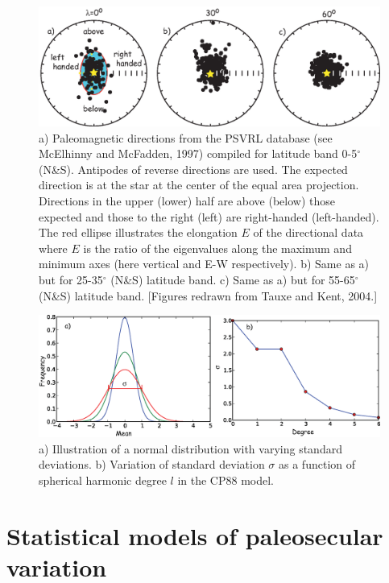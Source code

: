\begin{figure}[htb]
\centering  \includegraphics[width=14 cm]{EPSfiles/psvrl.eps}
\caption{a) Paleomagnetic directions from the PSVRL database (see  McElhinny and McFadden, 1997) compiled for latitude band 0-5$^{\circ}$ (N\&S).  Antipodes of reverse directions are used.  The expected direction is at the star at the center of the equal area projection.  Directions in the upper (lower) half are above (below) those expected and those to the right (left) are right-handed (left-handed).  The red ellipse illustrates the elongation $E$ of the directional data where $E$ is the ratio of the eigenvalues along the maximum and minimum axes (here vertical and E-W respectively).   b) Same as a) but for 25-35$^{\circ}$  (N\&S) latitude band.  c) Same as a) but for 55-65$^{\circ}$  (N\&S) latitude band. [Figures redrawn from Tauxe and Kent, 2004.]
   }
\label{fig:psvrl}
\end{figure}

\nocite{tauxe04}

\begin{figure}[htb]
\centering  \includegraphics[width=14 cm]{EPSfiles/bell.eps}
\caption{a) Illustration of a normal distribution with varying standard deviations.  b) Variation of standard deviation $\sigma$ as a function of spherical harmonic degree $l$ in the CP88 model. }
\label{fig:bell}
\end{figure}


\section{Statistical models of paleosecular variation}
\label{sect:psvmods}


